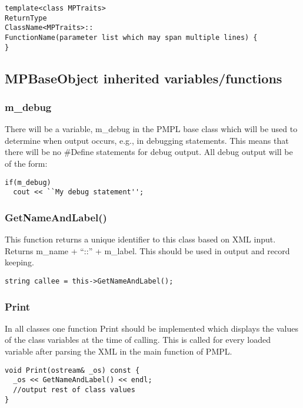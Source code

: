 \documentclass[12pt]{article}
\begin{document}
\begin{lstlisting}
template<class MPTraits>
ReturnType
ClassName<MPTraits>::
FunctionName(parameter list which may span multiple lines) {
}
\end{lstlisting}

\subsection{MPBaseObject inherited variables/functions}

\subsubsection{m\_debug}

There will be a variable, m\_debug in the PMPL base class which will be used to
determine when output occurs, e.g., in debugging statements. This means that
there will be no \#Define statements for debug output. All debug output will be
of the form:

\begin{lstlisting}
if(m_debug)
  cout << ``My debug statement'';
\end{lstlisting}

\subsubsection{GetNameAndLabel()}

This function returns a unique identifier to this class based on XML input.
Returns m\_name + ``::'' + m\_label. This should be used in output and record
keeping.

\begin{lstlisting}
string callee = this->GetNameAndLabel();
\end{lstlisting}

\subsubsection{Print}

In all classes one function Print should be implemented which displays the
values of the class variables at the time of calling. This is called for every
loaded variable after parsing the XML in the main function of PMPL.

\begin{lstlisting}
void Print(ostream& _os) const {
  _os << GetNameAndLabel() << endl;
  //output rest of class values
}
\end{lstlisting}
\end{document}
